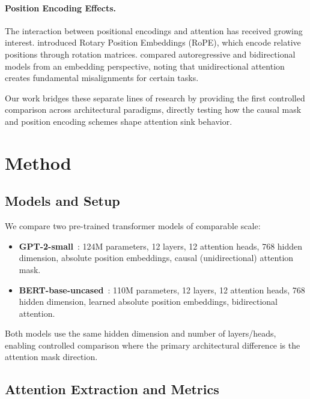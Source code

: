 \documentclass{article}
\begin{document}
\paragraph{Position Encoding Effects.}
The interaction between positional encodings and attention has received growing interest. \citet{su2024roformer} introduced Rotary Position Embeddings (RoPE), which encode relative positions through rotation matrices. \citet{zhang2025diffusion} compared autoregressive and bidirectional models from an embedding perspective, noting that unidirectional attention creates fundamental misalignments for certain tasks.

Our work bridges these separate lines of research by providing the first controlled comparison across architectural paradigms, directly testing how the causal mask and position encoding schemes shape attention sink behavior.

\section{Method}

\subsection{Models and Setup}

We compare two pre-trained transformer models of comparable scale:
\begin{itemize}
    \item \textbf{GPT-2-small}~\citep{radford2019language}: 124M parameters, 12 layers, 12 attention heads, 768 hidden dimension, absolute position embeddings, causal (unidirectional) attention mask.
    \item \textbf{BERT-base-uncased}~\citep{devlin2019bert}: 110M parameters, 12 layers, 12 attention heads, 768 hidden dimension, learned absolute position embeddings, bidirectional attention.
\end{itemize}

Both models use the same hidden dimension and number of layers/heads, enabling controlled comparison where the primary architectural difference is the attention mask direction.

\subsection{Attention Extraction and Metrics}
\end{document}
